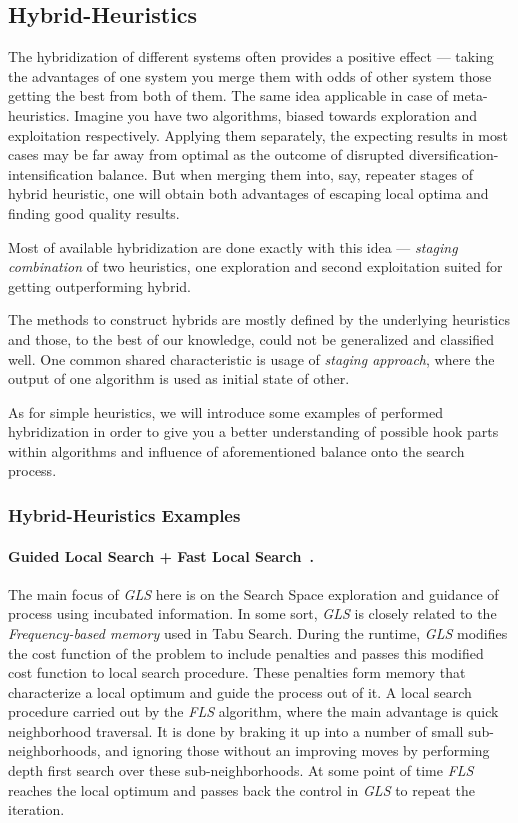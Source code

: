 \subsection{Hybrid-Heuristics}
The hybridization of different systems often provides a positive effect — taking the advantages of one system you merge them with odds of other system those getting the best from both of them. The same idea applicable in case of meta-heuristics. Imagine you have two algorithms, biased towards exploration and exploitation respectively. Applying them separately, the expecting results in most cases may be far away from optimal as the outcome of disrupted diversification-intensification balance. But when merging them into, say, repeater stages of hybrid heuristic, one will obtain both advantages of escaping local optima and finding good quality results. 

Most of available hybridization are done exactly with this idea — \textit{staging combination} of two heuristics, one exploration and second exploitation suited for getting outperforming hybrid.

The methods to construct hybrids are mostly defined by the underlying heuristics and those, to the best of our knowledge, could not be generalized and classified well. One common shared characteristic is usage of \textit{staging approach}, where the output of one algorithm is used as initial state of other. 

As for simple heuristics, we will introduce some examples of performed hybridization in order to give you a better understanding of possible hook parts within algorithms and influence of aforementioned balance onto the search process.

\subsubsection{Hybrid-Heuristics Examples}
\paragraph{Guided Local Search + Fast Local Search~\cite{tsang1997fast}.}
The main focus of \textit{GLS} here is on the Search Space exploration and guidance of process using incubated information. In some sort, \textit{GLS} is closely related to the \textit{Frequency-based memory} used in Tabu Search. During the runtime, \textit{GLS} modifies the cost function of the problem to include penalties and passes this modified cost function to local search procedure. These penalties form memory that characterize a local optimum and guide the process out of it. A local search procedure carried out by the \textit{FLS} algorithm, where the main advantage is quick neighborhood traversal. It is done by braking it up into a number of small sub-neighborhoods, and ignoring those without an improving moves by performing depth first search over these sub-neighborhoods. At some point of time \textit{FLS} reaches the local optimum and passes back the control in \textit{GLS} to repeat the iteration.

